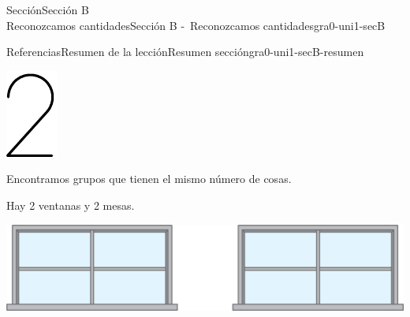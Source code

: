 \begin{sectionptx}{Sección}{{\Large Sección B\\}Reconozcamos cantidades}{}{Sección B -~Reconozcamos cantidades}{}{}{gra0-uni1-secB}
\begin{references-subsection}{Referencias}{Resumen de la lección}{}{Resumen sección}{}{}{gra0-uni1-secB-resumen}
\begin{sidebyside}{2}{0.1}{0.1}{0.2}
\begin{sbspanel}{0.1}
\includegraphics[max width=\linewidth, center]{external/svg-source/tikz-file-136325.pdf}
\end{sbspanel}%
\end{sidebyside}%
%
\par
Encontramos grupos que tienen el mismo número de cosas.%
\par
Hay 2 ventanas y 2 mesas.%
\begin{sidebyside}{2}{0.025}{0.025}{0.05}%
\begin{sbspanel}{0.5}%
\includegraphics[max width=\linewidth, center]{external/png-source/2-windows.png}

\end{sbspanel}
\end{sidebyside}
\end{references-subsection}
\end{sectionptx}
